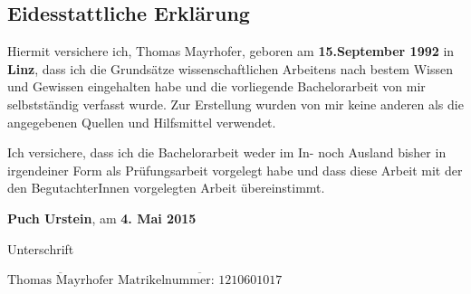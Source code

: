 \subsection*{Eidesstattliche Erklärung}

Hiermit versichere ich, Thomas Mayrhofer, geboren am {\bf 15.September 1992} in {\bf Linz}, dass ich die Grundsätze wissenschaftlichen Arbeitens nach bestem Wissen und Gewissen eingehalten habe und die vorliegende Bachelorarbeit von mir selbstständig verfasst wurde. Zur Erstellung wurden von mir keine anderen als die angegebenen Quellen und Hilfsmittel verwendet. 

Ich versichere, dass ich die Bachelorarbeit weder im In- noch Ausland bisher in irgendeiner Form als Prüfungsarbeit vorgelegt habe und dass diese Arbeit mit der den BegutachterInnen vorgelegten Arbeit übereinstimmt.


\vspace*{3cm}

{\bf Puch Urstein}, am {\bf 4. Mai 2015}


\hfill


Unterschrift

\vspace*{1cm}

$\overline{\text{Thomas Mayrhofer}}$ \hfill	$\overline{\text{Matrikelnummer: 1210601017}}$